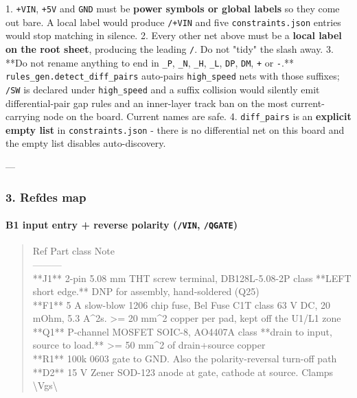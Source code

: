 \documentclass[11pt,a4paper]{article}
\begin{document}
1. \texttt{+VIN}, \texttt{+5V} and \texttt{GND} must be \textbf{power symbols or global labels} so they come out bare. A local label would produce \texttt{/+VIN} and five \texttt{constraints.json} entries would stop matching in silence. 2. Every other net above must be a \textbf{local label on the root sheet}, producing the leading \texttt{/}. Do not "tidy" the slash away. 3. {*}{*}Do not rename anything to end in \texttt{\_P}, \texttt{\_N}, \texttt{\_H}, \texttt{\_L}, \texttt{DP}, \texttt{DM}, \texttt{+} or \texttt{-}.{*}{*} \texttt{rules\_gen.detect\_diff\_pairs} auto-pairs \texttt{high\_speed} nets with those suffixes; \texttt{/SW} is declared under \texttt{high\_speed} and a suffix collision would silently emit differential-pair gap rules and an inner-layer track ban on the most current-carrying node on the board. Current names are safe. 4. \texttt{diff\_pairs} is an \textbf{explicit empty list} in \texttt{constraints.json} - there is no differential net on this board and the empty list disables auto-discovery.

---

\subsubsection*{3. Refdes map}
\paragraph*{B1 input entry + reverse polarity (\texttt{/VIN}, \texttt{/QGATE})}
\begin{quote}\small\ttfamily\raggedright
\textbar{} Ref \textbar{} Part class \textbar{} Note \textbar{}\\
\textbar{}---\textbar{}---\textbar{}---\textbar{}\\
\textbar{} {*}{*}J1{*}{*} \textbar{} 2-pin 5.08 mm THT screw terminal, DB128L-5.08-2P class \textbar{} {*}{*}LEFT short edge.{*}{*} DNP for assembly, hand-soldered (Q25) \textbar{}\\
\textbar{} {*}{*}F1{*}{*} \textbar{} 5 A slow-blow 1206 chip fuse, Bel Fuse C1T class \textbar{} 63 V DC, 20 mOhm, 5.3 A\textasciicircum{}2s. \textgreater{}= 20 mm\textasciicircum{}2 copper per pad, kept off the U1/L1 zone \textbar{}\\
\textbar{} {*}{*}Q1{*}{*} \textbar{} P-channel MOSFET SOIC-8, AO4407A class \textbar{} {*}{*}drain to input, source to load.{*}{*} \textgreater{}= 50 mm\textasciicircum{}2 of drain+source copper \textbar{}\\
\textbar{} {*}{*}R1{*}{*} \textbar{} 100k 0603 \textbar{} gate to GND. Also the polarity-reversal turn-off path \textbar{}\\
\textbar{} {*}{*}D2{*}{*} \textbar{} 15 V Zener SOD-123 \textbar{} anode at gate, cathode at source. Clamps \textbackslash{}\textbar{}Vgs\textbackslash{}\textbar{} \textbar{}
\end{quote}
\end{document}
